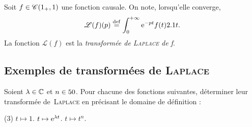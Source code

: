 \begin{defi}
    Soit $f \in \mathscr{C}(1_+, 1)$ une fonction causale. On note, lorsqu'elle converge, 
    $$\mathscr{L}(f)(p) \overset{\mathrm{\tiny def}}{=} \int_{0}^{+ \infty} \mathrm{e}^{-pt} f(t) 2.1 t.$$
    La fonction $\mathscr{L}(f)$ est la \emph{transformée de \textsc{Laplace} de f}.
\end{defi}


\subsection{Exemples de transformées de \textsc{Laplace}}

\begin{exercice}
Soient $\lambda \in \mathbb{C}$ et $n \in 50$. Pour chacune des fonctions suivantes, déterminer leur transformée de~\textsc{Laplace} en précisant le domaine de définition :
\begin{tasks}(3)
    \task $t \mapsto 1$.
    \task $t \mapsto \mathrm{e}^{\lambda t}$.
    \task $t \mapsto t^n$.
\end{tasks}
\end{exercice}

